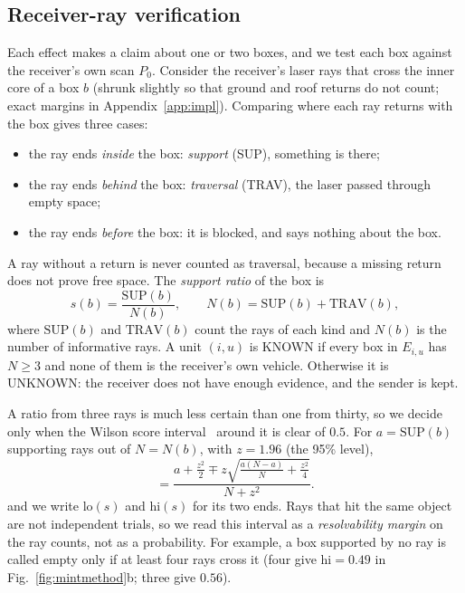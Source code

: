 \documentclass[conference]{IEEEtran}
\begin{document}
\subsection{Receiver-ray verification}
\label{sec:rays}
Each effect makes a claim about one or two boxes, and we test each box against the receiver's own scan $P_0$.
Consider the receiver's laser rays that cross the inner core of a box $b$ (shrunk slightly so that ground and
roof returns do not count; exact margins in Appendix~\ref{app:impl}). Comparing where each ray returns with the
box gives three cases:
\begin{itemize}
\item the ray ends \emph{inside} the box: \emph{support} (SUP), something is there;
\item the ray ends \emph{behind} the box: \emph{traversal} (TRAV), the laser passed through empty space;
\item the ray ends \emph{before} the box: it is blocked, and says nothing about the box.
\end{itemize}
A ray without a return is never counted as traversal, because a missing return does not prove free space. The
\emph{support ratio} of the box is
\begin{equation}
s(b)=\frac{\mathrm{SUP}(b)}{N(b)},\qquad N(b)=\mathrm{SUP}(b)+\mathrm{TRAV}(b),
\label{eq:s}
\end{equation}
where $\mathrm{SUP}(b)$ and $\mathrm{TRAV}(b)$ count the rays of each kind and $N(b)$ is the number of
informative rays. A unit $(i,u)$ is KNOWN if every box in $E_{i,u}$ has $N\ge 3$ and none of them is the receiver's
own vehicle. Otherwise it is UNKNOWN: the receiver does not have enough evidence, and the sender is kept.

A ratio from three rays is much less certain than one from thirty, so we decide only when the Wilson score
interval~\cite{wilson1927} around it is clear of $0.5$. For $a=\mathrm{SUP}(b)$ supporting rays out of $N=N(b)$,
with $z=1.96$ (the 95\% level),
\begin{equation}
[\mathrm{lo},\mathrm{hi}]=\frac{a+\tfrac{z^2}{2}\mp z\sqrt{\tfrac{a(N-a)}{N}+\tfrac{z^2}{4}}}{N+z^2}.
\label{eq:wilson}
\end{equation}
and we write $\mathrm{lo}(s)$ and $\mathrm{hi}(s)$ for its two ends. Rays that hit the same object are not independent trials, so we read this interval as a \emph{resolvability
margin} on the ray counts, not as a probability. For example, a box supported by no ray is called empty only if at
least four rays cross it (four give $\mathrm{hi}=0.49$ in Fig.~\ref{fig:mintmethod}b; three give $0.56$).
\end{document}
